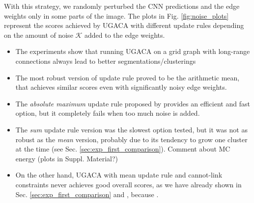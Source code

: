 With this strategy, we randomly perturbed the CNN predictions and the edge weights only in some parts of the image. The plots in Fig. \ref{fig:noise_plots} represent the scores achieved by UGACA with different update rules depending on the amount of noise $\mathcal{K}$ added to the edge weights. 
\begin{itemize}
\item The experiments show that running UGACA on a grid graph with long-range connections always lead to better segmentations/clusterings 
\item The most robust version of update rule proved to be the arithmetic mean, that achieves similar scores even with significantly noisy edge weights.
\item The \emph{absolute maximum} update rule proposed by \cite{wolf2018mutex} provides an efficient and fast option, but it completely fails when too much noise is added.
\item The \emph{sum} update rule version was the slowest option tested, but it was not as robust as the \emph{mean} version, probably due to its tendency to grow one cluster at the time (see Sec. \ref{sec:exp_first_comparison}). Comment about MC energy (plots in Suppl. Material?)
\item On the other hand, UGACA with mean update rule and cannot-link constraints never achieves good overall scores, as we have already shown in Sec. \ref{sec:exp_first_comparison} and , because . 
\end{itemize}

